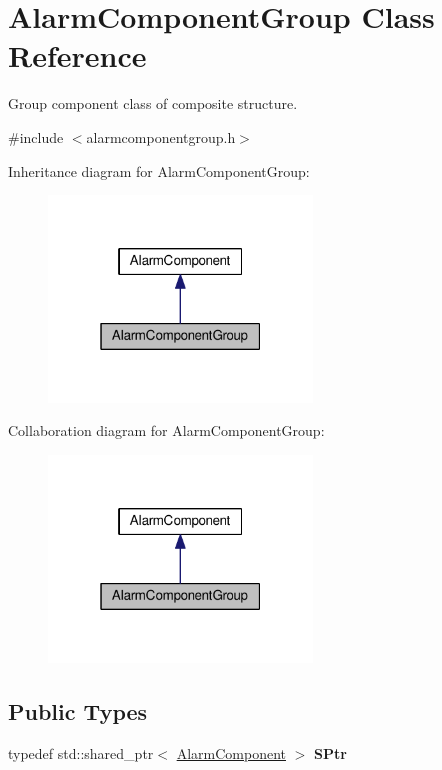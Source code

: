 \hypertarget{classAlarmComponentGroup}{}\section{Alarm\+Component\+Group Class Reference}
\label{classAlarmComponentGroup}


Group component class of composite structure.  




{\ttfamily \#include $<$alarmcomponentgroup.\+h$>$}



Inheritance diagram for Alarm\+Component\+Group\+:\nopagebreak
\begin{figure}[H]
\begin{center}
\leavevmode
\includegraphics[width=199pt]{classAlarmComponentGroup__inherit__graph}
\end{center}
\end{figure}


Collaboration diagram for Alarm\+Component\+Group\+:\nopagebreak
\begin{figure}[H]
\begin{center}
\leavevmode
\includegraphics[width=199pt]{classAlarmComponentGroup__coll__graph}
\end{center}
\end{figure}
\subsection*{Public Types}
\begin{DoxyCompactItemize}
\item 
typedef std\+::shared\+\_\+ptr$<$ \hyperlink{classAlarmComponent}{Alarm\+Component} $>$ {\bfseries S\+Ptr}\hypertarget{classAlarmComponentGroup_a007ed91b5a3919ad1b4a76350d3f6774}{}\label{classAlarmComponentGroup_a007ed91b5a3919ad1b4a76350d3f6774}

\end{DoxyCompactItemize}
